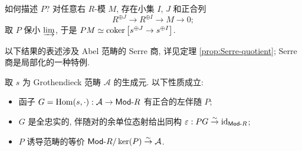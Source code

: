 如何描述 $P$? 对任意右 $R$-模 $M$, 存在小集 $I$, $J$ 和正合列
\[ R^{\oplus J} \to R^{\oplus I} \to M \to 0; \]
取 $P$ 保小 $\varinjlim$, 于是 $PM \simeq \operatorname{coker}\left[ s^{\oplus J} \to s^{\oplus I} \right]$.

以下结果的表述涉及 Abel 范畴的 Serre 商, 详见定理 \ref{prop:Serre-quotient}; Serre 商是局部化的一种特例.

\begin{theorem}\label{prop:GP}
	取 $s$ 为 Grothendieck 范畴 $\mathcal{A}$ 的生成元. 以下性质成立:
	\begin{itemize}
		\item 函子 $G = \operatorname{Hom}(s, \cdot): \mathcal{A} \to \mathsf{Mod}\text{-}R$ 有正合的左伴随 $P$;
		\item $G$ 是全忠实的, 伴随对的余单位态射给出同构 $\varepsilon: PG \stackrel{\sim}{\rightarrow} \mathrm{id}_{\mathsf{Mod}\text{-}R}$;
		\item $P$ 诱导范畴的等价 $\mathsf{Mod}\text{-}R / \operatorname{ker}(P) \stackrel{\sim}{\rightarrow} \mathcal{A}$.
	\end{itemize}
\end{theorem}
